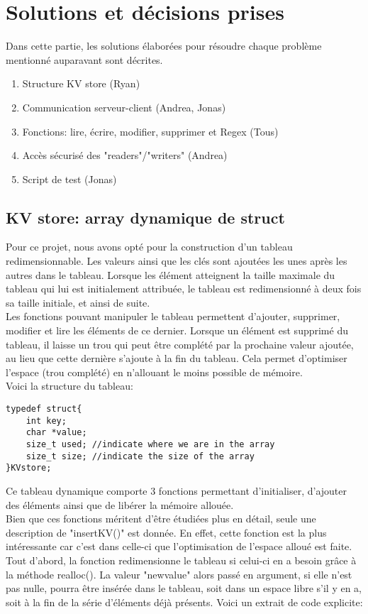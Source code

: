 \documentclass[11pt,a4paper]{article}
\begin{document}
\section{Solutions et décisions prises}
Dans cette partie, les solutions élaborées pour résoudre chaque problème mentionné auparavant sont décrites.

\begin{enumerate}
\item Structure KV store (Ryan)
\item Communication serveur-client (Andrea, Jonas)
\item Fonctions: lire, écrire, modifier, supprimer  et Regex (Tous)
\item Accès sécurisé des "readers"/"writers" (Andrea)
\item Script de test (Jonas)
\end{enumerate}

\subsection{KV store: array dynamique de struct}
Pour ce projet, nous avons opté pour la construction d'un tableau redimensionnable. Les valeurs ainsi que les clés sont ajoutées les unes après les autres dans le tableau. Lorsque les élément atteignent la taille maximale du tableau qui lui est initialement attribuée, le tableau est redimensionné à deux fois sa taille initiale, et ainsi de suite.\\
Les fonctions pouvant manipuler le tableau permettent d'ajouter, supprimer, modifier et  lire les éléments de ce dernier. Lorsque un élément est supprimé du tableau, il laisse un trou qui peut être complété par la prochaine valeur ajoutée, au lieu que cette dernière s'ajoute à la fin du tableau. Cela permet d'optimiser l'espace (trou complété) en n'allouant le moins possible de mémoire.\\
Voici la structure du tableau:

\begin{lstlisting}
typedef struct{
    int key; 
    char *value;
    size_t used; //indicate where we are in the array
    size_t size; //indicate the size of the array
}KVstore;
\end{lstlisting}

Ce tableau dynamique comporte 3 fonctions permettant d'initialiser, d'ajouter des éléments ainsi que de libérer la mémoire allouée. \\
Bien que ces fonctions méritent d'être étudiées plus en détail, seule une description de "insertKV()" est donnée. En effet, cette fonction est la plus intéressante car c'est dans celle-ci que l'optimisation de l'espace alloué est faite.\\
Tout d'abord, la fonction redimensionne le tableau si celui-ci en a besoin  grâce à la méthode realloc(). La valeur "newvalue" alors passé en argument, si elle n'est pas nulle,  pourra être insérée dans le tableau, soit dans un espace libre s'il y en a, soit à la fin de la série d'éléments déjà présents. Voici un extrait de code explicite:
\end{document}
